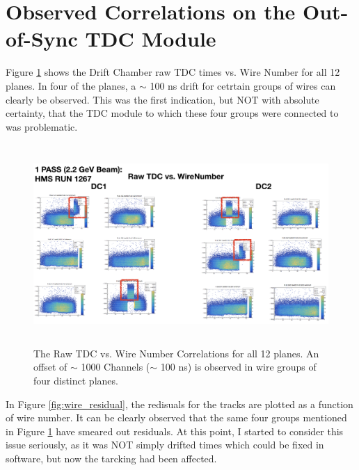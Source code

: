 \documentclass[11pt]{article}
\begin{document}
\section{Observed Correlations on the Out-of-Sync TDC Module}
\noindent Figure \ref{fig:shift_dtimes} shows the Drift Chamber raw TDC times vs. Wire Number for all 12 planes. In four of the planes,
a $\sim$ 100 ns drift for cetrtain groups of wires can clearly be observed. This was the first indication, but NOT with absolute certainty,
that the TDC module to which these four groups were connected to was problematic.
\begin{figure}[h!]
  \centering
  \includegraphics[width=6.0in, height=3.0in]{shifted_drifttimes.png}
  \caption{The Raw TDC vs. Wire Number Correlations for all 12 planes. An offset of $\sim$ 1000 Channels ($\sim$ 100 ns) is observed
    in wire groups of four distinct planes.}
  \label{fig:shift_dtimes}
\end{figure}
\newpage
In Figure \ref{fig:wire_residual}, the redisuals for the tracks are plotted as a function of wire number. It can be clearly observed that the same four groups mentioned in
Figure \ref{fig:shift_dtimes} have smeared out residuals. At this point, I started to consider this issue seriously, as it was NOT simply drifted times which could be fixed in
software, but now the tarcking had been affected.
\end{document}

